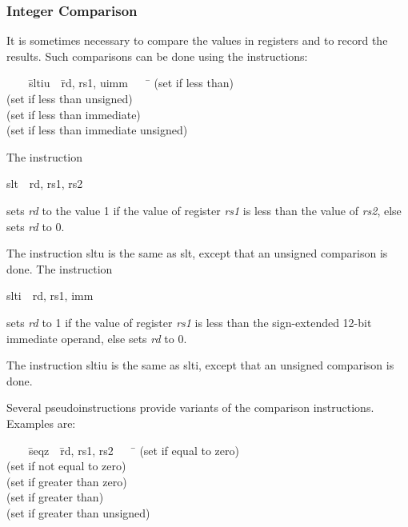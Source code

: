 \documentclass[11pt, twoside, pdftex]{article}
\newenvironment{ctabbing}%
{\begin{center}\begin{minipage}{\textwidth}\begin{tabbing}}
{\end{tabbing}\end{minipage}\end{center}}
\begin{document}
\subsubsection{Integer Comparison}
\label{sec:compare}

It is sometimes necessary to compare the values in registers and to record the results.
Such comparisons can be done using the instructions: 
\vspace{-\baselineskip}
\begin{ctabbing}
~~~~\={\sf sltiu}~~\={\sf rd, rs1, uimm}~~~~\=\kill
{}  \>(set if less than)\\
  \>(set if less than unsigned)\\
  \>(set if less than immediate)\\
  \>(set if less than immediate unsigned)
\end{ctabbing}

\noindent
The instruction
\vspace{-\baselineskip}
\begin{center}
{\sf slt~~rd, rs1, rs2}
\end{center}
\noindent
sets {\it rd} to the value 1 if the value of register {\it rs1} is less than the
value of {\it rs2}, else sets {\it rd} to 0.

The instruction {\sf sltu} is the same as {\sf slt}, except that an unsigned comparison is done. 
\newpage
\noindent
The instruction
\vspace{-\baselineskip}
\begin{center}
{\sf slti~~rd, rs1, imm}
\end{center}
\noindent
sets {\it rd} to 1 if the value of register {\it rs1} is less than the sign-extended 12-bit
immediate operand, else sets {\it rd} to 0.

The instruction {\sf sltiu} is the same as {\sf slti}, except that an unsigned comparison
is done.

Several pseudoinstructions provide variants of the comparison instructions. Examples are:
\vspace{-\baselineskip}
\begin{ctabbing}
~~~~\={\sf seqz}~~\={\sf rd, rs1, rs2}~~~~\=\kill
{}  \>(set if equal to zero)\\
  \>(set if not equal to zero)\\
  \>(set if greater than zero)\\
  \>(set if greater than)\\
  \>(set if greater than unsigned)\\
\end{ctabbing}
\end{document}

